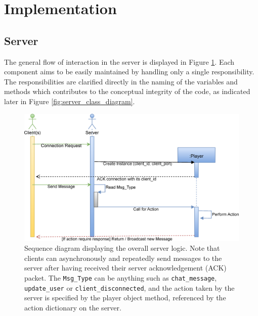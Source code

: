 \documentclass[bsc, 12pt, twoside, singlespacing, parskip, abbrevs, notimes, normalheadings, logo, deptreport]{styles/infthesis}
\begin{document}
\section{Implementation}
\subsection{Server}
The general flow of interaction in the server is displayed in Figure \ref{fig:server_sequence_diagram}. Each component aims to be easily maintained by handling only a single responsibility. The responsibilities are clarified directly in the naming of the variables and methods which contributes to the conceptual integrity of the code, as indicated later in Figure \ref{fig:server_class_diagram}.

\begin{figure}[H]
\includegraphics[scale=0.3]{images/server_sequence_diagram2.eps}
\caption{Sequence diagram displaying the overall server logic. Note that clients can asynchronously and repeatedly send messages to the server after having received their server acknowledgement (ACK) packet. The \texttt{Msg\_Type} can be anything such as \texttt{chat\_message}, \texttt{update\_user} or \texttt{client\_disconnected}, and the action taken by the server is specified by the player object method, referenced by the action dictionary on the server.}
\label{fig:server_sequence_diagram}
\end{figure}
\end{document}

